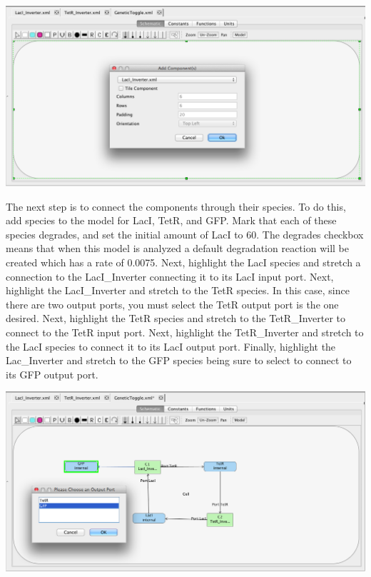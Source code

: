 \documentclass[titlepage,11pt]{article}
\begin{document}
\begin{center}
\includegraphics[width=160mm]{screenshots/subModelGT}
\end{center}

The next step is to connect the components through their species.   To do this, add species to the model for LacI, TetR, and GFP.  Mark that each of these species degrades, and set the initial amount of LacI to 60.  The degrades checkbox means that when this model is analyzed a default degradation reaction will be created which has a rate of 0.0075.  Next, highlight the LacI species and stretch a connection to the LacI\_Inverter connecting it to its LacI input port.  Next, highlight the LacI\_Inverter and stretch to the TetR species.  In this case, since there are two output ports, you must select the TetR output port is the one desired.  Next, highlight the TetR species and stretch to the TetR\_Inverter to connect to the TetR input port.  Next, highlight the TetR\_Inverter and stretch to the LacI species to connect it to its LacI output port.  Finally, highlight the Lac\_Inverter and stretch to the GFP species being sure to select to connect to its GFP output port.  

\begin{center}
\includegraphics[width=160mm]{screenshots/addConnectionGT}
\end{center}
\end{document}
